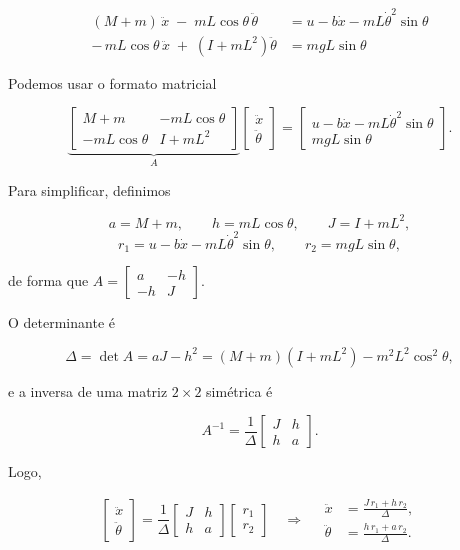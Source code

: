 \documentclass[brazil, 12pt]{article}
\begin{document}
\[
\begin{aligned}
(M+m)\,\ddot{x} \;-\; mL\cos\theta\,\ddot{\theta}
&= u - b\dot{x} - mL\dot{\theta}^{2}\sin\theta \\[4pt]
-\,mL\cos\theta\,\ddot{x} \;+\; \left(I+mL^{2}\right)\ddot{\theta}
&= mgL\sin\theta
\end{aligned}
\]

Podemos usar o formato matricial

\[
\underbrace{
\begin{bmatrix}
M+m & -mL\cos\theta \\[2pt]
-mL\cos\theta & I+mL^{2}
\end{bmatrix}}_{A}
\begin{bmatrix}
\ddot{x} \\[2pt] \ddot{\theta}
\end{bmatrix}
=
\begin{bmatrix}
u - b\dot{x} - mL\dot{\theta}^{2}\sin\theta \\[2pt]
mgL\sin\theta
\end{bmatrix}.
\]

Para simplificar, definimos

\[
a = M+m, \qquad
h = mL\cos\theta, \qquad
J = I + mL^{2},
\]
\[
r_1 = u - b\dot{x} - mL\dot{\theta}^{2}\sin\theta, \qquad
r_2 = mgL\sin\theta,
\]

de forma que $A=\begin{bmatrix} a & -h \\ -h & J \end{bmatrix}$.


O determinante é

\[
\Delta = \det A = aJ - h^{2}
= (M+m)\left(I+mL^{2}\right) - m^{2}L^{2}\cos^{2}\theta,
\]

e a inversa de uma matriz $2\times2$ simétrica é

\[
A^{-1} = \frac{1}{\Delta}
\begin{bmatrix}
J & h \\ h & a
\end{bmatrix}.
\]

Logo,

\[
\begin{bmatrix}
\ddot{x} \\[2pt] \ddot{\theta}
\end{bmatrix}
= \frac{1}{\Delta}
\begin{bmatrix}
J & h \\ h & a
\end{bmatrix}
\begin{bmatrix}
r_1 \\[2pt] r_2
\end{bmatrix}
\quad\Longrightarrow\quad
\begin{aligned}
\ddot{x} &= \frac{J\,r_1 + h\,r_2}{\Delta}, \\[6pt]
\ddot{\theta} &= \frac{h\,r_1 + a\,r_2}{\Delta}.
\end{aligned}
\]
\end{document}
